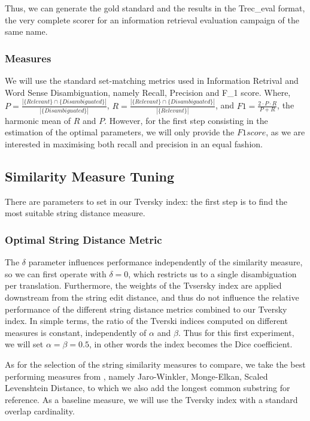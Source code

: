 \documentclass[10pt, a4paper]{article}
\begin{document}
Thus, we can generate the gold standard and the results in the Trec\_eval format, the very complete scorer for an information retrieval evaluation campaign of the same name.

\subsubsection{Measures}
We will use the standard set-matching metrics used in Information Retrival and Word Sense Disambiguation, namely Recall, Precision and F\_{1} score. Where, \(P=\frac{|\{Relevant\}\cap\{Disambiguated\}|}{|\{Disambiguated\}|}\), \(R=\frac{|\{Relevant\}\cap\{Disambiguated\}|}{|\{Relevant\}|}\), and \(F1 = \frac{2\cdot P \cdot R}{P + R} \), the harmonic mean of \(R\) and \(P\). However, for the first step consisting in the estimation of the optimal parameters, we will only provide the \(F1 score\), as we are interested in maximising both recall and precision in an equal fashion.
\subsection{Similarity Measure Tuning}
There are parameters to set in our Tversky index: the first step is to find the most suitable string distance measure.

\subsubsection{Optimal String Distance Metric}
 The \(\delta\) parameter influences performance independently of the similarity measure, so we can first operate with \(\delta=0\), which restricts us to a single disambiguation per translation. Furthermore, the weights of the Tvsersky index are applied downstream from the string edit distance, and thus do not influence the relative performance of the different string distance metrics combined to our Tversky index. In simple terms, the ratio of the Tverski indices computed on different measures is constant, independently of \(\alpha\) and \(\beta\).  Thus for this first experiment, we will set \(\alpha=\beta=0.5\), in other words the index becomes the Dice coefficient.

As for the selection of the string similarity measures to compare, we take the best performing measures from \cite{Cohen2003}, namely Jaro-Winkler, Monge-Elkan, Scaled Levenshtein Distance, to which we also add the longest common substring for reference. As a baseline measure, we will use the Tversky index with a standard overlap cardinality.
\end{document}
